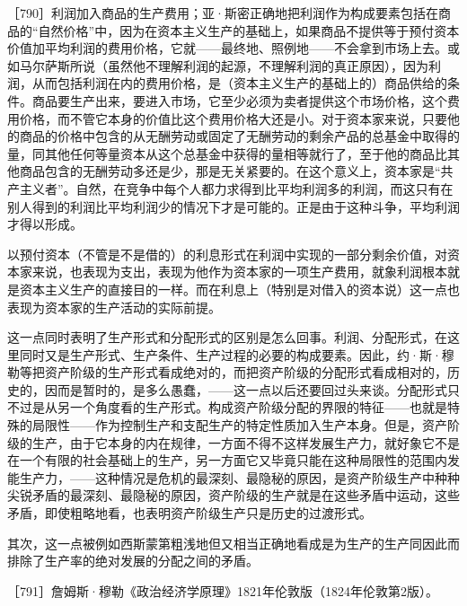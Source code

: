 ［790］利润加入商品的生产费用；亚·斯密正确地把利润作为构成要素包括在商品的“自然价格”中，因为在资本主义生产的基础上，如果商品不提供等于预付资本价值加平均利润的费用价格，它就——最终地、照例地——不会拿到市场上去。或如马尔萨斯所说（虽然他不理解利润的起源，不理解利润的真正原因），因为利润，从而包括利润在内的费用价格，是（资本主义生产的基础上的）商品供给的条件。商品要生产出来，要进入市场，它至少必须为卖者提供这个市场价格，这个费用价格，而不管它本身的价值比这个费用价格大还是小。对于资本家来说，只要他的商品的价格中包含的从无酬劳动或固定了无酬劳动的剩余产品的总基金中取得的量，同其他任何等量资本从这个总基金中获得的量相等就行了，至于他的商品比其他商品包含的无酬劳动多还是少，那是无关紧要的。在这个意义上，资本家是“共产主义者”。自然，在竞争中每个人都力求得到比平均利润多的利润，而这只有在别人得到的利润比平均利润少的情况下才是可能的。正是由于这种斗争，平均利润才得以形成。

以预付资本（不管是不是借的）的利息形式在利润中实现的一部分剩余价值，对资本家来说，也表现为支出，表现为他作为资本家的一项生产费用，就象利润根本就是资本主义生产的直接目的一样。而在利息上（特别是对借入的资本说）这一点也表现为资本家的生产活动的实际前提。

这一点同时表明了生产形式和分配形式的区别是怎么回事。利润、分配形式，在这里同时又是生产形式、生产条件、生产过程的必要的构成要素。因此，约·斯·穆勒等把资产阶级的生产形式看成绝对的，而把资产阶级的分配形式看成相对的，历史的，因而是暂时的，是多么愚蠢，——这一点以后还要回过头来谈。分配形式只不过是从另一个角度看的生产形式。构成资产阶级分配的界限的特征——也就是特殊的局限性——作为控制生产和支配生产的特定性质加入生产本身。但是，资产阶级的生产，由于它本身的内在规律，一方面不得不这样发展生产力，就好象它不是在一个有限的社会基础上的生产，另一方面它又毕竟只能在这种局限性的范围内发能生产力，——这种情况是危机的最深刻、最隐秘的原因，是资产阶级生产中种种尖锐矛盾的最深刻、最隐秘的原因，资产阶级的生产就是在这些矛盾中运动，这些矛盾，即使粗略地看，也表明资产阶级生产只是历史的过渡形式。

其次，这一点被例如西斯蒙第粗浅地但又相当正确地看成是为生产的生产同因此而排除了生产率的绝对发展的分配之间的矛盾。


［791］詹姆斯·穆勒《政治经济学原理》1821年伦敦版（1824年伦敦第2版）。

